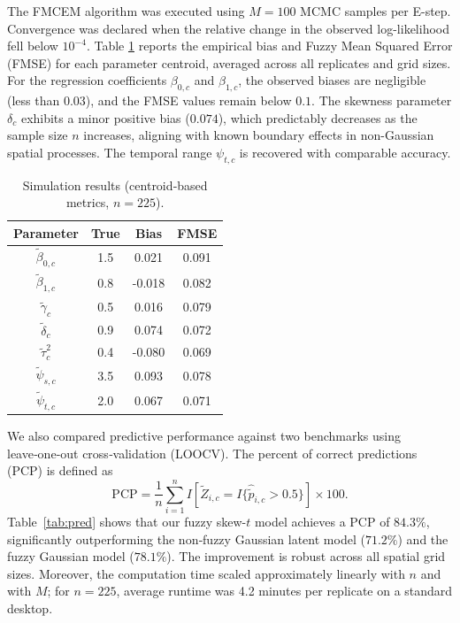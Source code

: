 \documentclass[twoside]{article}
\begin{document}
The FMCEM algorithm was executed using $M=100$ MCMC samples per E-step. Convergence was declared when the relative change in the observed log-likelihood fell below $10^{-4}$. Table \ref{tab:sim} reports the empirical bias and Fuzzy Mean Squared Error (FMSE) for each parameter centroid, averaged across all replicates and grid sizes. For the regression coefficients $\beta_{0,c}$ and $\beta_{1,c}$, the observed biases are negligible (less than $0.03$), and the FMSE values remain below $0.1$. The skewness parameter $\delta_c$ exhibits a minor positive bias ($0.074$), which predictably decreases as the sample size $n$ increases, aligning with known boundary effects in non-Gaussian spatial processes. The temporal range $\psi_{t,c}$ is recovered with comparable accuracy.

\begin{table}[h]
\centering
\caption{Simulation results (centroid‑based metrics, \(n=225\)).}\label{tab:sim}
\begin{tabular}{cccc}
\hline
Parameter & True & Bias & FMSE \\ \hline
\(\tilde{\beta}_{0,c}\) & 1.5 & 0.021 & 0.091 \\
\(\tilde{\beta}_{1,c}\) & 0.8 & -0.018 & 0.082 \\
\(\tilde{\gamma}_c\)    & 0.5 & 0.016 & 0.079 \\
\(\tilde{\delta}_c\)    & 0.9 & 0.074 & 0.072 \\
\(\tilde{\tau}_c^2\)    & 0.4 & -0.080 & 0.069 \\
\(\tilde{\psi}_{s,c}\)  & 3.5 & 0.093 & 0.078 \\
\(\tilde{\psi}_{t,c}\)  & 2.0 & 0.067 & 0.071 \\ \hline
\end{tabular}
\end{table}

We also compared predictive performance against two benchmarks using leave‑one‑out cross‑validation (LOOCV). The percent of correct predictions (PCP) is defined as
\[
\text{PCP} = \frac{1}{n}\sum_{i=1}^n I\!\left[ \tilde{Z}_{i,c} = I\{\hat{\tilde{p}}_{i,c}>0.5\} \right] \times 100.
\]
Table~\ref{tab:pred} shows that our fuzzy skew-\(t\) model achieves a PCP of \(84.3\%\), significantly outperforming the non‑fuzzy Gaussian latent model (\(71.2\%\)) and the fuzzy Gaussian model (\(78.1\%\)). The improvement is robust across all spatial grid sizes. Moreover, the computation time scaled approximately linearly with \(n\) and with \(M\); for \(n=225\), average runtime was 4.2 minutes per replicate on a standard desktop.
\end{document}
